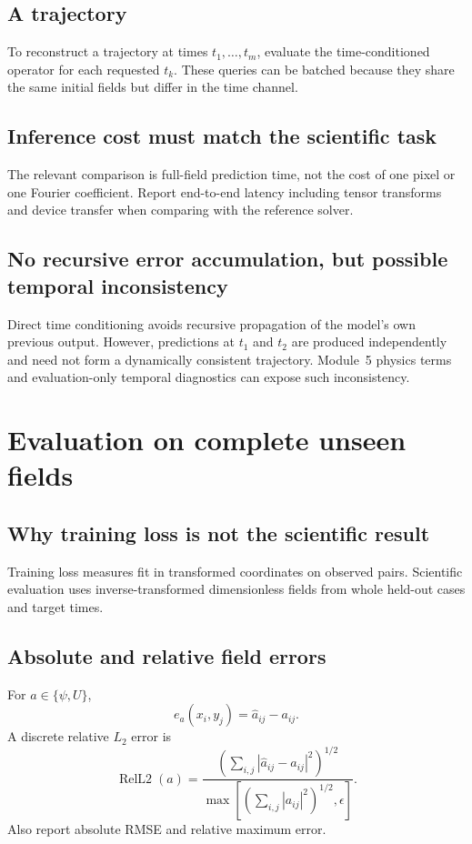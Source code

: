 \documentclass[11pt]{article}
\newcommand{\RelLtwo}{\operatorname{RelL2}}
\begin{document}
\subsection{A trajectory}
To reconstruct a trajectory at times $t_1,\ldots,t_m$, evaluate the time-conditioned operator for each requested $t_k$. These queries can be batched because they share the same initial fields but differ in the time channel.

\subsection{Inference cost must match the scientific task}
The relevant comparison is full-field prediction time, not the cost of one pixel or one Fourier coefficient. Report end-to-end latency including tensor transforms and device transfer when comparing with the reference solver.

\subsection{No recursive error accumulation, but possible temporal inconsistency}
Direct time conditioning avoids recursive propagation of the model's own previous output. However, predictions at $t_1$ and $t_2$ are produced independently and need not form a dynamically consistent trajectory. Module~5 physics terms and evaluation-only temporal diagnostics can expose such inconsistency.

\section{Evaluation on complete unseen fields}
\label{sec:evaluation}

\subsection{Why training loss is not the scientific result}
Training loss measures fit in transformed coordinates on observed pairs. Scientific evaluation uses inverse-transformed dimensionless fields from whole held-out cases and target times.

\subsection{Absolute and relative field errors}
For $a\in\{\psi,U\}$,
\[
e_a(x_i,y_j)=\widehat a_{ij}-a_{ij}.
\]
A discrete relative $L_2$ error is
\[
\RelLtwo(a)=
\frac{\left(\sum_{i,j}|\widehat a_{ij}-a_{ij}|^2\right)^{1/2}}
{\max\!\left[\left(\sum_{i,j}|a_{ij}|^2\right)^{1/2},\epsilon\right]}.
\]
Also report absolute RMSE and relative maximum error.
\end{document}
